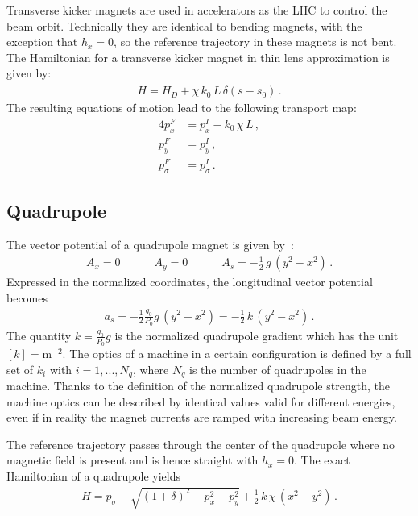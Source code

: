 Transverse kicker magnets are used in accelerators as the LHC to control the beam orbit. Technically they are identical to bending magnets, with the exception that $h_x=0$, so the reference trajectory in these magnets is not bent. The Hamiltonian for a transverse kicker magnet in thin lens approximation is given by:
%
\begin{align}
  H=  H_D + \chi \, k_0 \, L \, \bar{\delta}(s-s_0) \, .
\end{align}
%
The resulting equations of motion lead to the following transport map:
\begin{alignat}{4}
p_x^F & = p_x^I - k_0 \, \chi \, L\, \label{eq:thindipolekick} ,\\ 
p_y^F & = p_y^I\, ,\\ 
p_\sigma^F & = p_\sigma^I \, .
\end{alignat}




\subsection{Quadrupole}
%
The vector potential of a quadrupole magnet is given by~\cite{CERN-SL-95-12}:
\begin{align}
A_x = 0 \quad \quad \quad A_y = 0 \quad \quad \quad A_s = - \frac{1}{2} \, g \, (y^2 -x^2) \, .
\end{align}
%
Expressed in the normalized coordinates, the longitudinal vector potential becomes
%
\begin{align}
a_s = - \frac{1}{2} \frac{q_0}{P_0} g  \, (y^2 -x^2)  = - \frac{1}{2} \, k \,  (y^2 -x^2) \, .
\end{align}
The quantity $k=\frac{q_0}{P_0} g$ is the normalized quadrupole gradient which has the unit $[k] = \text{m}^{-2}$. The optics of a machine in a certain configuration is defined by a full set of $k_i$ with $i= 1,...,N_q$, where $N_q$ is the number of quadrupoles in the machine. Thanks to the definition of the normalized quadrupole strength, the machine optics can be described by identical values valid for different energies, even if in reality the magnet currents are ramped with increasing beam energy. 

The reference trajectory passes through the center of the quadrupole where no magnetic field is present and is hence straight with $h_x=0$. The exact Hamiltonian of a quadrupole yields 
\begin{align}
H = p_\sigma - \sqrt{(1+\delta)^2 - p_x^2 -p_y^2} + \frac{1}{2} \, k \, \chi\, (x^2 -y^2) \, .
\end{align}

